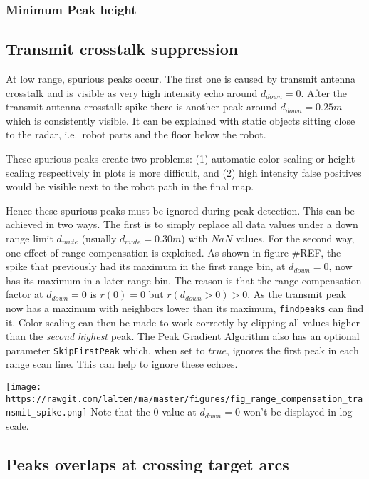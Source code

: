 \subsubsection{Minimum Peak height}\label{minimum-peak-height}

\subsection{Transmit crosstalk
suppression}\label{transmit-crosstalk-suppression}

At low range, spurious peaks occur. The first one is caused by transmit
antenna crosstalk and is visible as very high intensity echo around
\(d_{down}=0\). After the transmit antenna crosstalk spike there is
another peak around \(d_{down}=0.25m\) which is consistently visible. It
can be explained with static objects sitting close to the radar,
i.e.~robot parts and the floor below the robot.

These spurious peaks create two problems: (1) automatic color scaling or
height scaling respectively in plots is more difficult, and (2) high
intensity false positives would be visible next to the robot path in the
final map.

Hence these spurious peaks must be ignored during peak detection. This
can be achieved in two ways. The first is to simply replace all data
values under a down range limit \(d_{mute}\) (usually
\(d_{mute}=0.30m\)) with \(NaN\) values. For the second way, one effect
of range compensation is exploited. As shown in figure \#REF, the spike
that previously had its maximum in the first range bin, at
\(d_{down}=0\), now has its maximum in a later range bin. The reason is
that the range compensation factor at \(d_{down}=0\) is \(r(0) = 0\) but
\(r(d_{down}>0) > 0\). As the transmit peak now has a maximum with
neighbors lower than its maximum, \texttt{findpeaks} can find it. Color
scaling can then be made to work correctly by clipping all values higher
than the \emph{second highest} peak. The Peak Gradient Algorithm also
has an optional parameter \texttt{SkipFirstPeak} which, when set to
\(true\), ignores the first peak in each range scan line. This can help
to ignore these echoes.

\texttt{[image: https://rawgit.com/lalten/ma/master/figures/fig\_range\_compensation\_transmit\_spike.png]}
Note that the \(0\) value at \(d_{down}=0\) won't be displayed in log
scale.

\subsection{Peaks overlaps at crossing target
arcs}\label{peaks-overlaps-at-crossing-target-arcs}

